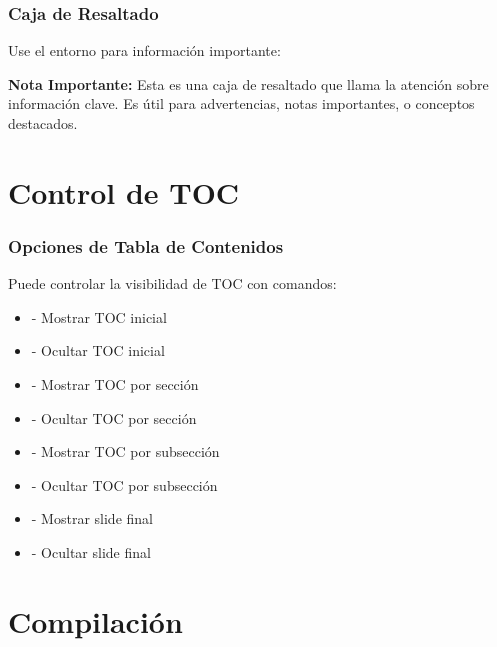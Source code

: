 \documentclass{pt-slides}
\begin{document}
\begin{frame}
    \frametitle{Caja de Resaltado}

    Use el entorno  para información importante:

    \vspace{0.3cm}

    \begin{highlightbox}
        \textbf{Nota Importante:} Esta es una caja de resaltado que llama la atención sobre información clave. Es útil para advertencias, notas importantes, o conceptos destacados.
    \end{highlightbox}
\end{frame}

\section{Control de TOC}

\begin{frame}
    \frametitle{Opciones de Tabla de Contenidos}

    Puede controlar la visibilidad de TOC con comandos:

    \begin{itemize}
        \item {} - Mostrar TOC inicial
        \item {} - Ocultar TOC inicial
        \item {} - Mostrar TOC por sección
        \item {} - Ocultar TOC por sección
        \item {} - Mostrar TOC por subsección
        \item {} - Ocultar TOC por subsección
        \item {} - Mostrar slide final
        \item {} - Ocultar slide final
    \end{itemize}
\end{frame}

\section{Compilación}
\end{document}
